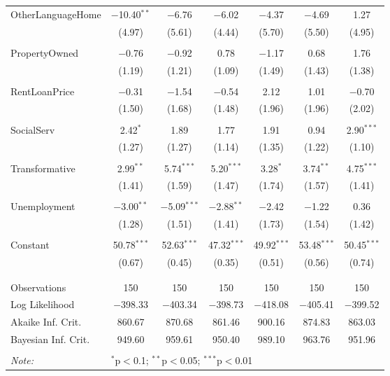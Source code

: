 \documentclass[openany]{book}
\begin{document}
\begin{table}[!htbp]
\begin{tabular}{@{\extracolsep{1pt}}lcccccc}
 OtherLanguageHome & $-$10.40$^{**}$ & $-$6.76 & $-$6.02 & $-$4.37 & $-$4.69 & 1.27 \\ 
  & (4.97) & (5.61) & (4.44) & (5.70) & (5.50) & (4.95) \\ 
  & & & & & & \\ 
 PropertyOwned & $-$0.76 & $-$0.92 & 0.78 & $-$1.17 & 0.68 & 1.76 \\ 
  & (1.19) & (1.21) & (1.09) & (1.49) & (1.43) & (1.38) \\ 
  & & & & & & \\ 
 RentLoanPrice & $-$0.31 & $-$1.54 & $-$0.54 & 2.12 & 1.01 & $-$0.70 \\ 
  & (1.50) & (1.68) & (1.48) & (1.96) & (1.96) & (2.02) \\ 
  & & & & & & \\ 
 SocialServ & 2.42$^{*}$ & 1.89 & 1.77 & 1.91 & 0.94 & 2.90$^{***}$ \\ 
  & (1.27) & (1.27) & (1.14) & (1.35) & (1.22) & (1.10) \\ 
  & & & & & & \\ 
 Transformative & 2.99$^{**}$ & 5.74$^{***}$ & 5.20$^{***}$ & 3.28$^{*}$ & 3.74$^{**}$ & 4.75$^{***}$ \\ 
  & (1.41) & (1.59) & (1.47) & (1.74) & (1.57) & (1.41) \\ 
  & & & & & & \\ 
 Unemployment & $-$3.00$^{**}$ & $-$5.09$^{***}$ & $-$2.88$^{**}$ & $-$2.42 & $-$1.22 & 0.36 \\ 
  & (1.28) & (1.51) & (1.41) & (1.73) & (1.54) & (1.42) \\ 
  & & & & & & \\ 
 Constant & 50.78$^{***}$ & 52.63$^{***}$ & 47.32$^{***}$ & 49.92$^{***}$ & 53.48$^{***}$ & 50.45$^{***}$ \\ 
  & (0.67) & (0.45) & (0.35) & (0.51) & (0.56) & (0.74) \\ 
  & & & & & & \\ 
\hline \\[-1.8ex] 
Observations & 150 & 150 & 150 & 150 & 150 & 150 \\ 
Log Likelihood & $-$398.33 & $-$403.34 & $-$398.73 & $-$418.08 & $-$405.41 & $-$399.52 \\ 
Akaike Inf. Crit. & 860.67 & 870.68 & 861.46 & 900.16 & 874.83 & 863.03 \\ 
Bayesian Inf. Crit. & 949.60 & 959.61 & 950.40 & 989.10 & 963.76 & 951.96 \\ 
\hline 
\hline \\[-1.8ex] 
\textit{Note:}  & \multicolumn{6}{l}{$^{*}$p$<$0.1; $^{**}$p$<$0.05; $^{***}$p$<$0.01} \\ 

\end{tabular}
\end{table}
\end{document}
